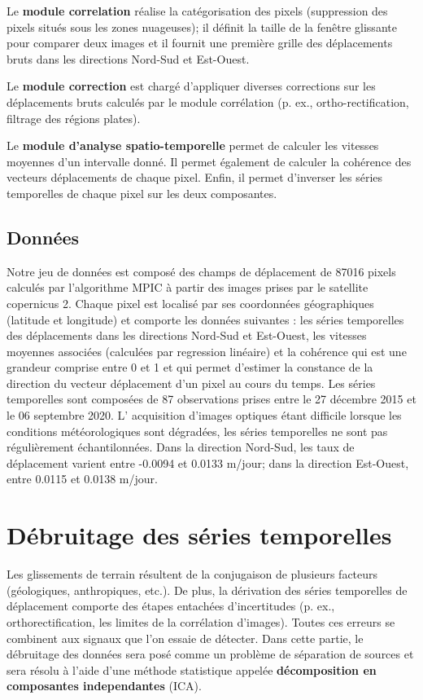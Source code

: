 \documentclass[11pt, openany]{report}
\begin{document}
Le \textbf{module correlation} réalise la catégorisation des pixels (suppression des pixels situés sous les zones nuageuses); il définit la  taille de la fenêtre glissante pour comparer deux images et il fournit une première grille des déplacements bruts dans les directions Nord-Sud et Est-Ouest.

Le \textbf{module correction} est chargé d'appliquer diverses corrections sur les déplacements bruts calculés par le module corrélation (p. ex., ortho-rectification, filtrage des régions plates).

Le \textbf{module d'analyse spatio-temporelle} permet de calculer les vitesses moyennes d'un intervalle donné. Il permet également de calculer la cohérence des vecteurs déplacements de chaque pixel. Enfin, il permet d'inverser les séries temporelles de chaque pixel sur les deux composantes.

\section{Données}
Notre jeu de données est composé des champs de déplacement de 87016 pixels calculés par l'algorithme MPIC à partir des images prises par le satellite copernicus 2. Chaque pixel est localisé par ses coordonnées géographiques (latitude et longitude) et comporte les données suivantes : les séries temporelles des déplacements dans les directions Nord-Sud et Est-Ouest, les vitesses moyennes associées (calculées par regression linéaire) et la cohérence qui est une grandeur comprise entre 0 et 1 et qui permet d'estimer la constance de la direction du vecteur déplacement d'un pixel au cours du temps. Les séries temporelles sont composées de 87 observations prises entre le 27 décembre 2015 et le 06 septembre 2020. L' acquisition d'images optiques étant difficile lorsque les conditions météorologiques sont dégradées, les séries temporelles ne sont pas régulièrement échantilonnées. Dans la direction Nord-Sud, les taux de déplacement varient entre -0.0094  et 0.0133 m/jour; dans la direction Est-Ouest, entre 0.0115 et 0.0138 m/jour.

\chapter{Débruitage des séries temporelles}
Les glissements de terrain résultent de la conjugaison de plusieurs facteurs (géologiques, anthropiques, etc.). De plus, la dérivation des séries temporelles de déplacement comporte des étapes entachées d'incertitudes (p. ex., orthorectification, les limites de la corrélation d'images). Toutes ces erreurs se combinent aux signaux que l'on essaie de détecter. Dans cette partie, le débruitage des données sera posé comme un problème de séparation de sources et sera résolu à l'aide d'une méthode statistique appelée \textbf{décomposition en composantes independantes} (ICA).
\end{document}
